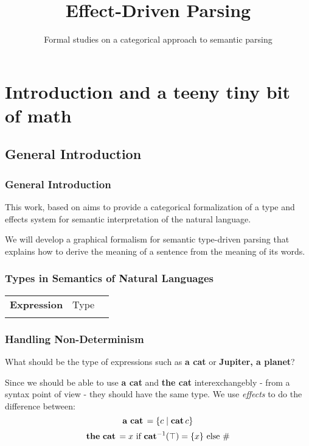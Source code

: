 \documentclass[math, english, info]{beamercours}
\title{Effect-Driven Parsing}
\subtitle{Formal studies on a categorical approach to semantic parsing}
\institute{École Normale Supérieure | Yale University}
\begin{document}
\fancytitleframe

\section{Introduction and a teeny tiny bit of math}
\subsection{General Introduction}
\begin{frame}
	\frametitle{General Introduction}
	This work, based on \cite{bumfordEffectdrivenInterpretationFunctors2025} aims
	to provide a categorical formalization of a type and effects system for
	semantic interpretation of the natural language.

	\medskip

	We will develop a graphical formalism for semantic type-driven parsing that
	explains how to derive the meaning of a sentence from the meaning of its
	words.
\end{frame}
\begin{frame}[fragile]
	\frametitle{Types in Semantics of Natural Languages}
	\setcellgapes{3pt}
	\makegapedcells
	\begin{NiceTabular}{>{\bf}LLL}
		Expression & \rm Type & \lambda{} \\
		\CodeAfter
	\end{NiceTabular}
\end{frame}

\begin{frame}[fragile]
	\frametitle{Handling Non-Determinism}
	What should be the type of expressions such as \textbf{a cat} or \textbf{Jupiter, a planet}?
	\pause

	\smallskip

	Since we should be able to use \textbf{a cat} and \textbf{the cat} interexchangebly - from a syntax point of view - they should have the same type.
	We use \emph{effects} to do the difference between:
	\begin{equation*}
		\mathbf{a\ cat}\, = \{c \mid \mathbf{cat}\, c\}
	\end{equation*}
	\begin{equation*}
		\mathbf{the\ cat}\, = x \text{ if } \mathbf{cat}^{-1}(\top) = \{x\} \text{ else } \#
	\end{equation*}
\end{frame}
\end{document}
